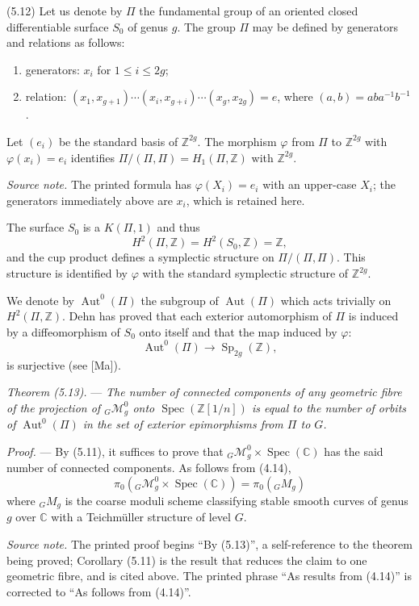 \documentclass[10pt]{article}
\newcommand{\Spec}{\operatorname{Spec}}
\newcommand{\Aut}{\operatorname{Aut}}
\begin{document}
\medskip
\noindent(5.12) Let us denote by $\Pi$ the fundamental group of an oriented closed differentiable surface $S_0$ of genus $g$. The group $\Pi$ may be defined by generators and relations as follows:
\begin{enumerate}[label=(\roman*)]
\item generators: $x_i$ for $1\leq i\leq 2g$;
\item relation: $(x_1,x_{g+1})\cdots(x_i,x_{g+i})\cdots(x_g,x_{2g})=e$, where $(a,b)=aba^{-1}b^{-1}$.
\end{enumerate}
Let $(e_i)$ be the standard basis of $\mathbb Z^{2g}$. The morphism $\varphi$ from $\Pi$ to $\mathbb Z^{2g}$ with $\varphi(x_i)=e_i$ identifies $\Pi/(\Pi,\Pi)=H_1(\Pi,\mathbb Z)$ with $\mathbb Z^{2g}$.

\noindent\textit{Source note.} The printed formula has $\varphi(X_i)=e_i$ with an upper-case $X_i$; the generators immediately above are $x_i$, which is retained here.

The surface $S_0$ is a $K(\Pi,1)$ and thus
\[
H^2(\Pi,\mathbb Z)=H^2(S_0,\mathbb Z)=\mathbb Z,
\]
and the cup product defines a symplectic structure on $\Pi/(\Pi,\Pi)$. This structure is identified by $\varphi$ with the standard symplectic structure of $\mathbb Z^{2g}$.

We denote by $\Aut^0(\Pi)$ the subgroup of $\Aut(\Pi)$ which acts trivially on $H^2(\Pi,\mathbb Z)$. Dehn has proved that each exterior automorphism of $\Pi$ is induced by a diffeomorphism of $S_0$ onto itself and that the map induced by $\varphi$:
\[
\Aut^0(\Pi)\longrightarrow \operatorname{Sp}_{2g}(\mathbb Z),
\]
is surjective (see [Ma]).

\medskip
\noindent\emph{Theorem (5.13).} --- \emph{The number of connected components of any geometric fibre of the projection of ${}_G\mathcal M_g^0$ onto $\Spec(\mathbb Z[1/n])$ is equal to the number of orbits of $\Aut^0(\Pi)$ in the set of exterior epimorphisms from $\Pi$ to $G$.}

\noindent\emph{Proof.} --- By (5.11), it suffices to prove that ${}_G\mathcal M_g^0\times\Spec(\mathbb C)$ has the said number of connected components. As follows from (4.14),
\[
\pi_0({}_G\mathcal M_g^0\times\Spec(\mathbb C))=\pi_0({}_GM_g)
\]
where ${}_GM_g$ is the coarse moduli scheme classifying stable smooth curves of genus $g$ over $\mathbb C$ with a Teichmüller structure of level $G$.

\noindent\textit{Source note.} The printed proof begins ``By (5.13)'', a self-reference to the theorem being proved; Corollary (5.11) is the result that reduces the claim to one geometric fibre, and is cited above. The printed phrase ``As results from (4.14)'' is corrected to ``As follows from (4.14)''.
\end{document}
